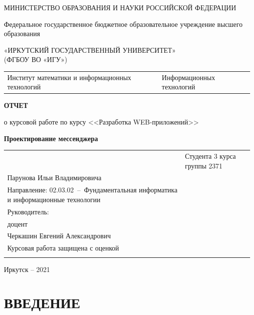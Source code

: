 \documentclass[14pt,final]{report}
\begin{document}
\thispagestyle{empty}
\begin{center}
МИНИСТЕРСТВО ОБРАЗОВАНИЯ И НАУКИ РОССИЙСКОЙ ФЕДЕРАЦИИ

Федеральное государственное бюджетное образовательное учреждение высшего образования

«ИРКУТСКИЙ  ГОСУДАРСТВЕННЫЙ УНИВЕРСИТЕТ»\\
(ФГБОУ ВО «ИГУ»)
\end{center}
\vfill %

\noindent\begin{tabularx}{\textwidth} {
  >{\raggedright\arraybackslash}X
  >{\raggedright\arraybackslash}X }
Институт математики и информационных технологий
&
Информационных технологий
\end{tabularx}

\vfill
\begin{center}
  \textbf{ОТЧЕТ}
\vspace{1em}

о курсовой работе по курсу <<Разработка WEB-приложений>>

{\bf Проектирование мессенджера}

\end{center}
\vfill

\noindent\begin{tabularx}{\textwidth} {
  >{\raggedright\arraybackslash}X
  >{\raggedright}X }
&

Студента 3 курса группы 2371\\
Парунова Ильи Владимировича\\
Направление\;: 02.03.02~--~Фундаментальная информатика и информационные технологии\\[2em]

Руководитель:\\
доцент\\
Черкашин Евгений Александрович\\[2em]

Курсовая работа защищена с оценкой\\[1em] \underline{\hspace{3cm}}
\end{tabularx}
\vfill
\begin{center}
  Иркутск -- 2021
\end{center}
\clearpage

\tableofcontents

\chapter*{ВВЕДЕНИЕ}
\end{document}
